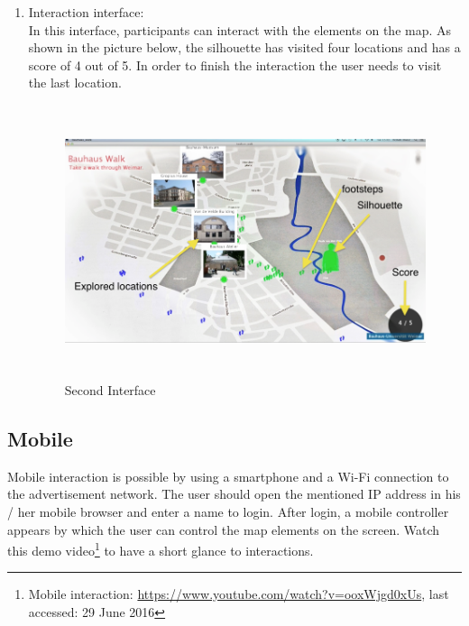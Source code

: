 \begin{enumerate}
\item Interaction interface: \\
In this interface, participants can interact with the elements on the map. As shown in the picture below, the silhouette has visited four locations and has a score of 4 out of 5. In order to finish the interaction the user needs to visit the last location.

\begin{figure}[H]
    \centering
    \includegraphics[width=130mm,height=80mm]{Figures/6/body/interaction_inter}
    \caption{Second Interface}%
    \label{fig:body_secondinterface}%
\end{figure}


\end{enumerate}

\subsection{Mobile}
Mobile interaction is possible by using a smartphone and a Wi-Fi connection to the advertisement network. The user should open the mentioned IP address in his / her mobile browser and enter a name to login. After login, a mobile controller appears by which the user can control the map elements on the screen. Watch this demo video\footnote{Mobile interaction: \url{https://www.youtube.com/watch?v=ooxWjgd0xUs}, last accessed: 29 June 2016} to have a short glance to interactions.

